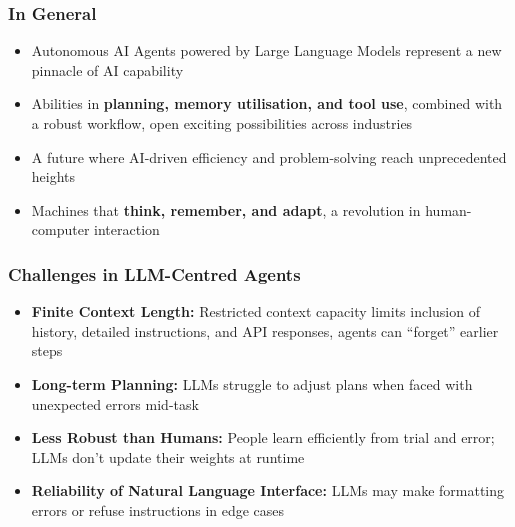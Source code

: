 \begin{frame}[fragile]\frametitle{In General}
  \begin{itemize}
    \item Autonomous AI Agents powered by Large Language Models represent a new pinnacle of AI capability
    \item Abilities in \textbf{planning, memory utilisation, and tool use}, combined with a robust workflow, open exciting possibilities across industries
    \item A future where AI-driven efficiency and problem-solving reach unprecedented heights
    \item Machines that \textbf{think, remember, and adapt}, a revolution in human-computer interaction
  \end{itemize}
\end{frame}

\begin{frame}[fragile]\frametitle{Challenges in LLM-Centred Agents}
  \begin{itemize}
    \item \textbf{Finite Context Length:} Restricted context capacity limits inclusion of history, detailed instructions, and API responses, agents can ``forget'' earlier steps
    \item \textbf{Long-term Planning:} LLMs struggle to adjust plans when faced with unexpected errors mid-task
    \item \textbf{Less Robust than Humans:} People learn efficiently from trial and error; LLMs don't update their weights at runtime
    \item \textbf{Reliability of Natural Language Interface:} LLMs may make formatting errors or refuse instructions in edge cases
  \end{itemize}
\end{frame}

